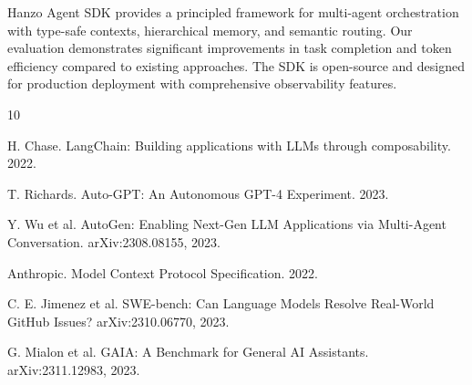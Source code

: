 \documentclass[11pt,twocolumn]{article}
\begin{document}
Hanzo Agent SDK provides a principled framework for multi-agent orchestration with type-safe contexts, hierarchical memory, and semantic routing. Our evaluation demonstrates significant improvements in task completion and token efficiency compared to existing approaches. The SDK is open-source and designed for production deployment with comprehensive observability features.


\begin{thebibliography}{10}

H. Chase. LangChain: Building applications with LLMs through composability. 2022.

T. Richards. Auto-GPT: An Autonomous GPT-4 Experiment. 2023.

Y. Wu et al. AutoGen: Enabling Next-Gen LLM Applications via Multi-Agent Conversation. arXiv:2308.08155, 2023.

Anthropic. Model Context Protocol Specification. 2022.

C. E. Jimenez et al. SWE-bench: Can Language Models Resolve Real-World GitHub Issues? arXiv:2310.06770, 2023.

G. Mialon et al. GAIA: A Benchmark for General AI Assistants. arXiv:2311.12983, 2023.

\end{thebibliography}
\end{document}
